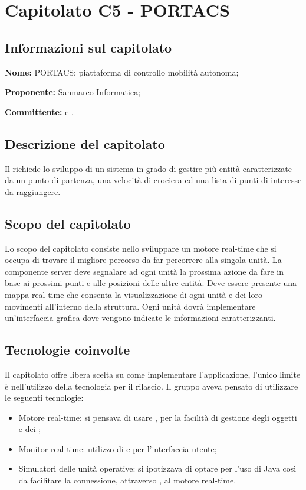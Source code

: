 \section{Capitolato C5 - PORTACS}\label{C5}
\subsection{Informazioni sul capitolato}
\begin{description}
	\item \textbf{Nome:} PORTACS: piattaforma di controllo mobilità autonoma;
	\item \textbf{Proponente:} Sanmarco Informatica;
	\item \textbf{Committente:} \VT{} e \CR{}.
\end{description}

\subsection{Descrizione del capitolato}
Il  richiede lo sviluppo di un sistema  in grado di gestire più entità caratterizzate da un punto di partenza, una velocità di crociera ed una lista di punti di interesse da raggiungere.

\subsection{Scopo del capitolato}
Lo scopo del capitolato consiste nello sviluppare un motore real-time che si occupa di trovare il migliore percorso da far percorrere alla singola unità.
La componente server deve segnalare ad ogni unità la prossima azione da fare in base ai prossimi punti e alle posizioni delle altre entità. Deve essere presente una mappa real-time che consenta la visualizzazione di ogni unità e dei loro movimenti all'interno della struttura. Ogni unità dovrà implementare un'interfaccia grafica dove vengono indicate le informazioni caratterizzanti.

\subsection{Tecnologie coinvolte}
Il capitolato offre libera scelta su come implementare l'applicazione, l'unico limite è nell'utilizzo della tecnologia  per il rilascio. Il gruppo aveva pensato di utilizzare le seguenti tecnologie:
\begin{itemize}
	\item Motore real-time: si pensava di usare , per la facilità di gestione degli oggetti e dei ;
	\item Monitor real-time: utilizzo di  e  per l'interfaccia utente;
	\item Simulatori delle unità operative: si ipotizzava di optare per l'uso di Java così da facilitare la connessione, attraverso , al motore real-time.
\end{itemize}

